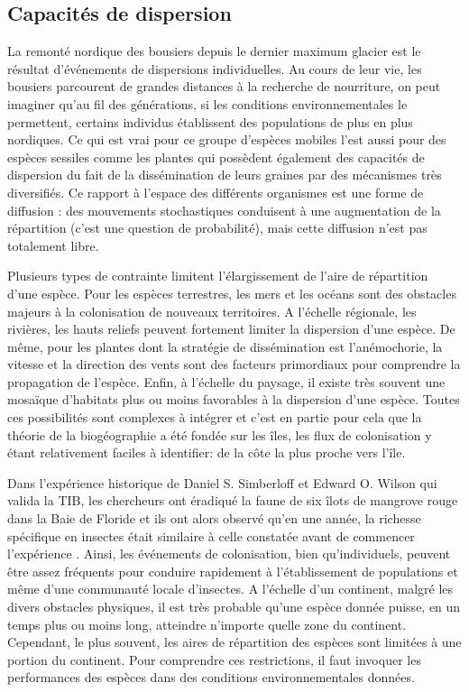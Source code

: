 \subsection*{Capacités de dispersion}\label{capacituxe9s-de-dispersion}

La remonté nordique des bousiers depuis le dernier maximum glacier est
le résultat d'événements de dispersions individuelles. Au cours de leur
vie, les bousiers parcourent de grandes distances à la recherche de
nourriture, on peut imaginer qu'au fil des générations, si les
conditions environnementales le permettent, certains individus
établissent des populations de plus en plus nordiques. Ce qui est vrai
pour ce groupe d'espèces mobiles l'est aussi pour des espèces sessiles
comme les plantes qui possèdent également des capacités de dispersion du
fait de la dissémination de leurs graines par des mécanismes très
diversifiés. Ce rapport à l'espace des différents organismes est une
forme de diffusion : des mouvements stochastiques conduisent à une
augmentation de la répartition (c'est une question de probabilité), mais
cette diffusion n'est pas totalement libre.

Plusieurs types de contrainte limitent l'élargissement de l'aire de
répartition d'une espèce. Pour les espèces terrestres, les mers et les
océans sont des obstacles majeurs à la colonisation de nouveaux
territoires. A l'échelle régionale, les rivières, les hauts reliefs
peuvent fortement limiter la dispersion d'une espèce. De même, pour les
plantes dont la stratégie de dissémination est l'anémochorie, la vitesse
et la direction des vents sont des facteurs primordiaux pour comprendre
la propagation de l'espèce. Enfin, à l'échelle du paysage, il existe
très souvent une mosaïque d'habitats plus ou moins favorables à la
dispersion d'une espèce. Toutes ces possibilités sont complexes à
intégrer et c'est en partie pour cela que la théorie de la biogéographie
a été fondée sur les îles, les flux de colonisation y étant relativement
faciles à identifier: de la côte la plus proche vers l'île.

Dans l'expérience historique de Daniel S. Simberloff et Edward O. Wilson
qui valida la TIB, les chercheurs ont éradiqué la faune de six îlots de
mangrove rouge dans la Baie de Floride et ils ont alors observé qu'en
une année, la richesse spécifique en insectes était similaire à celle
constatée avant de commencer l'expérience \citep{Simberloff1969}. Ainsi,
les événements de colonisation, bien qu'individuels, peuvent être assez
fréquents pour conduire rapidement à l'établissement de populations et
même d'une communauté locale d'insectes. A l'échelle d'un continent,
malgré les divers obstacles physiques, il est très probable qu'une
espèce donnée puisse, en un temps plus ou moins long, atteindre
n'importe quelle zone du continent. Cependant, le plus souvent, les
aires de répartition des espèces sont limitées à une portion du
continent. Pour comprendre ces restrictions, il faut invoquer les
performances des espèces dans des conditions environnementales données.

